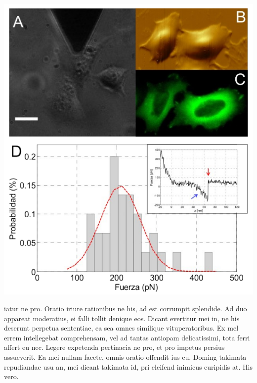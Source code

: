 \documentclass[11pt,a4paper]{article}
\begin{document}
\begin{multicols}{2}
\begin{center}
 \includegraphics[width=\columnwidth]{template_figura}
\end{center}

iatur ne pro. Oratio iriure rationibus ne his, ad est corrumpit splendide. Ad duo appareat moderatius, ei falli tollit denique eos. Dicant evertitur mei in, ne his deserunt perpetua sententiae, ea sea omnes similique vituperatoribus. Ex mel errem intellegebat comprehensam, vel ad tantas antiopam delicatissimi, tota ferri affert eu nec. Legere expetenda pertinacia ne pro, et pro impetus persius assueverit. Ea mei nullam facete, omnis oratio offendit ius cu. Doming takimata repudiandae usu an, mei dicant takimata id, pri 
eleifend inimicus euripidis at. His vero. 
\end{multicols}
\end{document}
